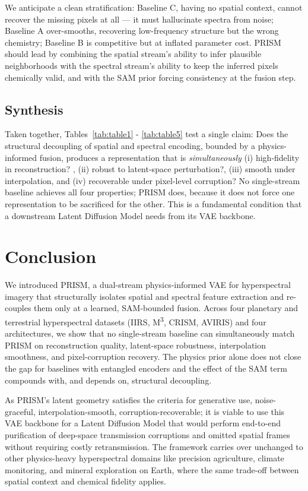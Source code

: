 \documentclass{article} %
\begin{document}
We anticipate a clean stratification: Baseline C, having no spatial context, cannot recover the missing pixels at all --- it must hallucinate spectra from noise; Baseline A over-smooths, recovering low-frequency structure but the wrong chemistry; Baseline B is competitive but at inflated parameter cost. PRISM should lead by combining the spatial stream's ability to infer plausible neighborhoods with the spectral stream's ability to keep the inferred pixels chemically valid, and with the SAM prior forcing consistency at the fusion step.

\subsection{Synthesis}

Taken together, Tables~\ref{tab:table1} - \ref{tab:table5} test a single claim: Does the structural decoupling of spatial and spectral encoding, bounded by a physics-informed fusion, produces a representation that is \emph{simultaneously} (i) high-fidelity in reconstruction? , (ii) robust to latent-space perturbation?, (iii) smooth under interpolation, and (iv) recoverable under pixel-level corruption? No single-stream baseline achieves all four properties; PRISM does, because it does not force one representation to be sacrificed for the other. This is a fundamental condition that a downstream Latent Diffusion Model needs from its VAE backbone.

\section{Conclusion}

We introduced PRISM, a dual-stream physics-informed VAE for hyperspectral imagery that structurally isolates spatial and spectral feature extraction and re-couples them only at a learned, SAM-bounded fusion. Across four planetary and terrestrial hyperspectral datasets (IIRS, M\textsuperscript{3}, CRISM, AVIRIS) and four architectures, we show that no single-stream baseline can simultaneously match PRISM on reconstruction quality, latent-space robustness, interpolation smoothness, and pixel-corruption recovery. The physics prior alone does not close the gap for baselines with entangled encoders and the effect of the SAM term compounds with, and depends on, structural decoupling.

As PRISM's latent geometry satisfies the criteria for generative use, noise-graceful, interpolation-smooth, corruption-recoverable; it is viable to use this VAE backbone for a Latent Diffusion Model that would perform end-to-end purification of deep-space transmission corruptions and omitted spatial frames without requiring costly retransmission. The framework carries over unchanged to other physics-heavy hyperspectral domains like precision agriculture, climate monitoring, and mineral exploration on Earth, where the same trade-off between spatial context and chemical fidelity applies.
\end{document}
